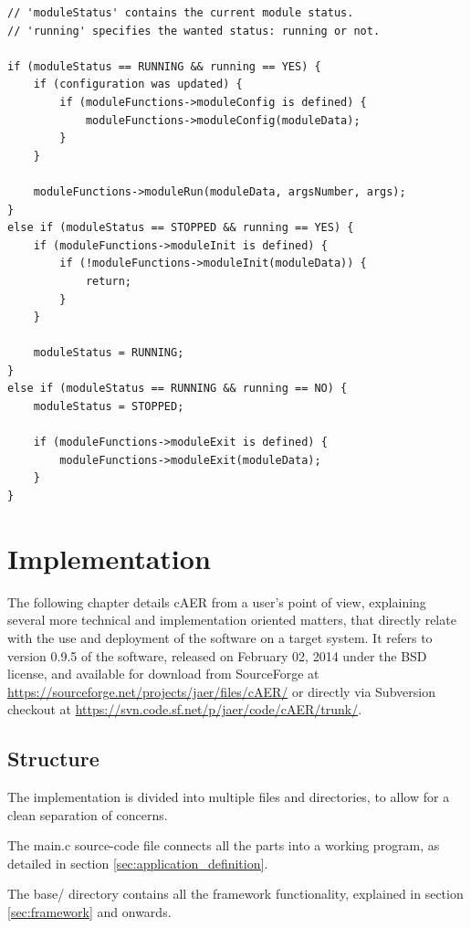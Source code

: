 \documentclass[a4paper,12pt]{report}
\begin{document}
\begin{lstlisting}
// 'moduleStatus' contains the current module status.
// 'running' specifies the wanted status: running or not.

if (moduleStatus == RUNNING && running == YES) {
    if (configuration was updated) {
        if (moduleFunctions->moduleConfig is defined) {
            moduleFunctions->moduleConfig(moduleData);
        }
    }

    moduleFunctions->moduleRun(moduleData, argsNumber, args);
}
else if (moduleStatus == STOPPED && running == YES) {
    if (moduleFunctions->moduleInit is defined) {
        if (!moduleFunctions->moduleInit(moduleData)) {
            return;
        }
    }

    moduleStatus = RUNNING;
}
else if (moduleStatus == RUNNING && running == NO) {
    moduleStatus = STOPPED;

    if (moduleFunctions->moduleExit is defined) {
        moduleFunctions->moduleExit(moduleData);
    }
}
\end{lstlisting}

\chapter{Implementation} \label{chap:implementation}

The following chapter details cAER from a user's point of view, explaining several more technical and implementation oriented matters, that directly relate with the use and deployment of the software on a target system.
It refers to version 0.9.5 of the software, released on February 02, 2014 under the BSD license, and available for download from SourceForge at \url{https://sourceforge.net/projects/jaer/files/cAER/} or directly via Subversion checkout at \url{https://svn.code.sf.net/p/jaer/code/cAER/trunk/}.

\section{Structure} \label{sec:structure}

The implementation is divided into multiple files and directories, to allow for a clean separation of concerns.

The main.c source-code file connects all the parts into a working program, as detailed in section \ref{sec:application_definition}.

The base/ directory contains all the framework functionality, explained in section \ref{sec:framework} and onwards.
\end{document}
